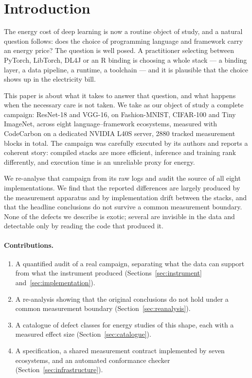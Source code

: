 \documentclass[11pt,a4paper]{article}
\begin{document}
\section{Introduction}
\label{sec:intro}

The energy cost of deep learning is now a routine object of study, and a natural
question follows: does the choice of programming language and framework carry an
energy price? The question is well posed. A practitioner selecting between
PyTorch, LibTorch, DL4J or an R binding is choosing a whole stack --- a binding
layer, a data pipeline, a runtime, a toolchain --- and it is plausible that the
choice shows up in the electricity bill.

This paper is about what it takes to answer that question, and what happens when
the necessary care is not taken. We take as our object of study a complete
campaign: ResNet-18 and VGG-16, on Fashion-MNIST, CIFAR-100 and Tiny ImageNet,
across eight language--framework ecosystems, measured with CodeCarbon on a
dedicated NVIDIA L40S server, \num{2880} tracked measurement blocks in total. The
campaign was carefully executed by its authors and reports a coherent story:
compiled stacks are more efficient, inference and training rank differently, and
execution time is an unreliable proxy for energy.

We re-analyse that campaign from its raw logs and audit the source of all eight
implementations. We find that the reported differences are largely produced by
the measurement apparatus and by implementation drift between the stacks, and
that the headline conclusions do not survive a common measurement boundary. None
of the defects we describe is exotic; several are invisible in the data and
detectable only by reading the code that produced it.

\paragraph{Contributions.}
\begin{enumerate}\itemsep2pt
  \item A quantified audit of a real campaign, separating what the data can
        support from what the instrument produced (Sections~\ref{sec:instrument}
        and~\ref{sec:implementation}).
  \item A re-analysis showing that the original conclusions do not hold under a
        common measurement boundary (Section~\ref{sec:reanalysis}).
  \item A catalogue of defect classes for energy studies of this shape, each with
        a measured effect size (Section~\ref{sec:catalogue}).
  \item A specification, a shared measurement contract implemented by seven
        ecosystems, and an automated conformance checker
        (Section~\ref{sec:infrastructure}).
\end{enumerate}
\end{document}
